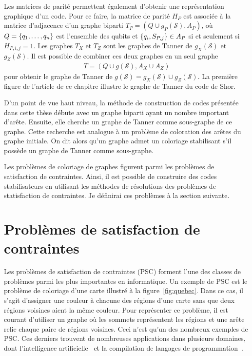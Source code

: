 Les matrices de parité permettent également d'obtenir une représentation graphique d'un code.
Pour ce faire, la matrice de parité $H_P$ est associée à la matrice d'adjacence d'un
graphe biparti $T_P = (Q \cup g_P(\mathcal S), A_P)$,
où $Q = \qty{q_1, \dots, q_n}$ est l'ensemble des qubits
et $\qty{q_i, S_{P, j}} \in A_P$ si et seulement si $H_{P, i, j} = 1$.
Les graphes $T_X$ et $T_Z$ sont les graphes de Tanner de $g_X(\mathcal S)$ et $g_Z(\mathcal S)$.
Il est possible de combiner ces deux graphes en un seul graphe
\begin{align}
  T = (Q \cup g(\mathcal S), A_X \cup A_Z)
\end{align}
pour obtenir le graphe de Tanner de $g(\mathcal S) = g_X(\mathcal S) \cup g_Z(\mathcal S)$.
La première figure de l'article de ce chapitre illustre le graphe de Tanner du code de Shor.

D'un point de vue haut niveau,
la méthode de construction de codes présentée dans cette thèse
débute avec un graphe biparti ayant un nombre important d'arête.
Ensuite, elle cherche un graphe de Tanner comme sous-graphe de ce graphe.
Cette recherche est analogue à un problème de coloration des arêtes du graphe initiale.
On dit alors qu'un graphe admet un coloriage stabilisant s'il possède un graphe de Tanner comme sous-graphe.

Les problèmes de coloriage de graphes figurent parmi les problèmes de satisfaction de contraintes.
Ainsi,
il est possible de construire des codes stabilisateurs en utilisant les méthodes 
de résolutions des problèmes de statisfaction de contraintes.
Je définirai ces problèmes à la section suivante.

\section{Problèmes de satisfaction de contraintes}
\label{sec:csp}

Les problèmes de satisfaction de contraintes (PSC)
forment l'une des classes de problèmes parmi les plus importantes en informatique.
Un exemple de PSC est le problème de coloriage d'une carte illustré à la figure~\ref{fig:quebec}.
Dans ce cas,
il s'agit d'assigner une couleur à chacune des régions d'une carte sans que deux régions voisines 
aient la même couleur.
Pour représenter ce problème,
il est courant d'utiliser un graphe où les sommets représentent les régions et une arête relie
chaque paire de régions voisines.
Ceci n'est qu'un des nombreux exemples de PSC.
Ces derniers trouvent de nombreuses applications dans plusieurs domaines,
dont l'intelligence artificielle~\cite{russel_artificial_nodate}
et la compilation de langages de programmation~\cite{aho_compilers_2006}.

